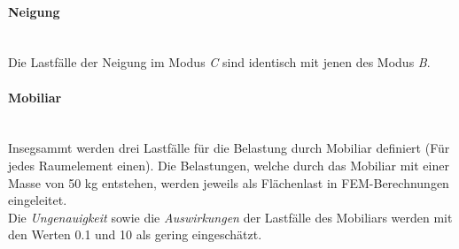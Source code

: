 \paragraph{Neigung}\mbox{}\\
Die Lastfälle der Neigung im Modus \emph{C} sind identisch mit jenen des Modus \emph{B}.

\paragraph{Mobiliar}\mbox{}\\
Insegsammt werden drei Lastfälle für die Belastung durch Mobiliar definiert (Für jedes Raumelement einen). Die Belastungen, welche durch das Mobiliar mit einer Masse von 50 kg entstehen, werden jeweils als Flächenlast in FEM-Berechnungen eingeleitet.\\
Die \emph{Ungenauigkeit} sowie die \emph{Auswirkungen} der Lastfälle des Mobiliars werden mit den Werten 0.1 und 10 als gering eingeschätzt.


